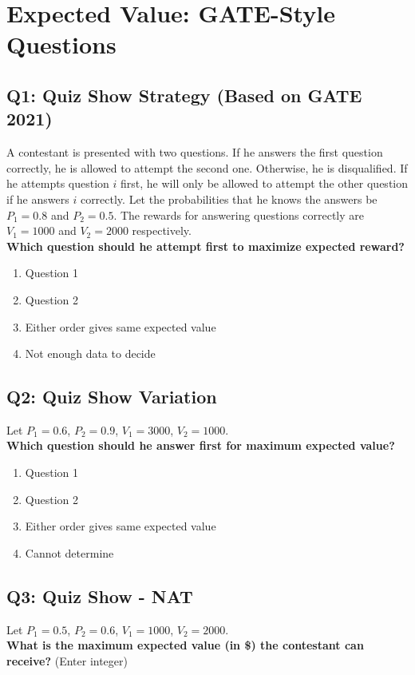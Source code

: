 \section{Expected Value: GATE-Style Questions}

\subsection*{Q1: Quiz Show Strategy (Based on GATE 2021)}
A contestant is presented with two questions. If he answers the first question correctly, he is allowed to attempt the second one. Otherwise, he is disqualified. If he attempts question $i$ first, he will only be allowed to attempt the other question if he answers $i$ correctly. Let the probabilities that he knows the answers be $P_1 = 0.8$ and $P_2 = 0.5$. The rewards for answering questions correctly are $V_1 = 1000$ and $V_2 = 2000$ respectively.\\
\textbf{Which question should he attempt first to maximize expected reward?}

\begin{enumerate}[label=(\alph*)]
\item Question 1
\item Question 2
\item Either order gives same expected value
\item Not enough data to decide
\end{enumerate}

\subsection*{Q2: Quiz Show Variation}
Let $P_1 = 0.6$, $P_2 = 0.9$, $V_1 = 3000$, $V_2 = 1000$.\\
\textbf{Which question should he answer first for maximum expected value?}

\begin{enumerate}[label=(\alph*)]
\item Question 1
\item Question 2
\item Either order gives same expected value
\item Cannot determine
\end{enumerate}

\subsection*{Q3: Quiz Show - NAT}
Let $P_1 = 0.5$, $P_2 = 0.6$, $V_1 = 1000$, $V_2 = 2000$.\\
\textbf{What is the maximum expected value (in \$) the contestant can receive?} (Enter integer)

